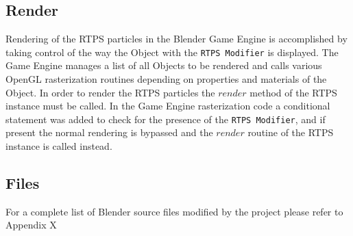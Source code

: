 \subsection{Render}
Rendering of the RTPS particles in the Blender Game Engine is accomplished by
taking control of the way the Object with the \verb|RTPS Modifier| is displayed. The
Game Engine manages a list of all Objects to be rendered and calls various
OpenGL rasterization routines depending on properties and materials of the
Object. In order to render the RTPS particles the $render$ method of the RTPS
instance must be called. In the Game Engine rasterization code a conditional
statement was added to check for the presence of the \verb|RTPS Modifier|, and if
present the normal rendering is bypassed and the $render$ routine of the RTPS
instance is called instead.

\subsection{Files}
For a complete list of Blender source files modified by the project please refer to Appendix X

